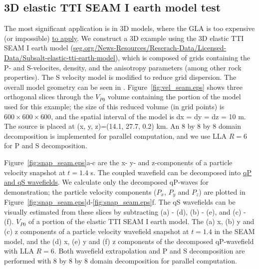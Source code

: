 \documentclass[manuscript,ulem,graphix,revised]{geophysics}
\begin{document}
\subsection{3D elastic TTI SEAM I earth model test}
\indent\indent
The most significant application is in 3D models, where the GLA is too expensive (or impossible) \marginnote{[16]}\uline{to apply}. We construct a 3D example using the 3D elastic TTI SEAM I earth model    (\url{seg.org/News-Resources/Reserach-Data/Licensed-Data/Subsalt-elastic-tti-earth-model}), which is composed of grids containing the P- and S-velocites, density, and the anisotropy parameters (among other rock properties). The S velocity model is modified to reduce grid dispersion. The overall model geometry can be seen in \citet{fehler11}. Figure~\ref{fig:vel_seam.eps} shows three orthogonal slices through the $V_{P0}$ volume containing the portion of the model used for this example; the size of this reduced volume (in grid points) is $600\times 600 \times 600$, and the spatial interval of the model is dx = dy = dz = 10 m. The source is placed at (x, y, z)=(14.1, 27.7, 0.2) km. An 8 by 8 by 8 domain decomposition is implemented for parallel computation, and we use LLA $R=6$ for P and S decomposition. 

Figure~\ref{fig:snap_seam.eps}a-c are  the x- y- and z-components of a particle velocity snapshot at $t=1.4$ s. The coupled wavefield can be decomposed into \marginnote{[39]}\uline{qP and qS wavefields}. We calculate only the decomposed qP-waves for demonstration; the particle velocity components ($P_x$, $P_y$ and $P_z$) are plotted in Figure~\ref{fig:snap_seam.eps}d-\ref{fig:snap_seam.eps}f. The qS wavefields can be visually estimated from these slices by subtracting (a) - (d), (b) - (e), and (c) - (f).  
{
$V_{P0}$ of a portion of the elastic TTI SEAM I earth model.
}
{
The (a) x, (b) y and (c) z components of a particle velocity wavefield snapshot at $t=1.4$ in the SEAM model, and the (d) x, (e) y and (f) z components of the decomposed qP-wavefield with LLA $R=6$. Both wavefield extrapolation and P and S decomposition are performed with 8 by 8 by 8 domain decomposition for parallel computation.
}


\end{document}
